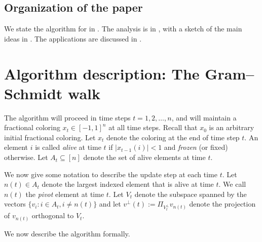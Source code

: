 \documentclass{toc}
\begin{document}
\subsection{Organization of the paper}
We state the algorithm for  in . The analysis is in , with a  sketch of the main ideas in . The applications are discussed in .

\section{Algorithm description: The Gram--Schmidt walk}
\label{sec:algorithm}

The algorithm will proceed in time steps $t=1,2,\ldots,n$, and will maintain a fractional coloring $x_t\in[-1,1]^n$ at all time steps. Recall that $x_0$ is an arbitrary initial fractional coloring.
Let $x_t$ denote the coloring at the end of time step $t$. An element $i$ is called \textit{alive} at time $t$ if $|x_{t-1}(i)|<1$ and \textit{frozen} (or fixed) otherwise. Let $A_t \subseteq [n]$  denote the set of alive elements at time $t$.

We now give some notation to describe the update step at each time $t$.  Let
$n(t) \in A_t$ denote the largest indexed element that is alive at time $t$. We call
$n(t)$ the \textit{pivot} element at time $t$.  Let $V_{t}$ denote the subspace
spanned by the vectors $\{v_i: i\in A_t, i\neq n(t)\}$ and let
$v^{\perp}(t) := \Pi_{V_t^\perp} v_{n(t)}$ denote the projection of $v_{n(t)}$
orthogonal to $V_{t}$.  

We now describe the algorithm formally.
\end{document}
